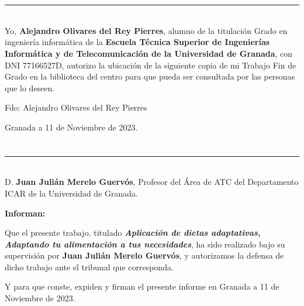\chapter*{}
\thispagestyle{empty}

\noindent\rule[-1ex]{\textwidth}{2pt}\\[4.5ex]

Yo, \textbf{Alejandro Olivares del Rey Pierres}, alumno de la titulación Grado en ingeniería informática de la \textbf{Escuela Técnica Superior
de Ingenierías Informática y de Telecomunicación de la Universidad de Granada}, con DNI 77166527D, autorizo la
ubicación de la siguiente copia de mi Trabajo Fin de Grado en la biblioteca del centro para que pueda ser
consultada por las personas que lo deseen.

\vspace{6cm}

\noindent Fdo: Alejandro Olivares del Rey Pierres

\vspace{2cm}

\begin{flushright}
Granada a 11 de Noviembre de 2023.
\end{flushright}


\chapter*{}
\thispagestyle{empty}

\noindent\rule[-1ex]{\textwidth}{2pt}\\[4.5ex]

D. \textbf{Juan Julián Merelo Guervós}, Profesor del Área de ATC del Departamento ICAR de la Universidad de Granada.

\vspace{0.5cm}

\textbf{Informan:}

\vspace{0.5cm}

Que el presente trabajo, titulado \textit{\textbf{Aplicación de dietas adaptativas,  Adaptando tu alimentación a tus necesidades}},
ha sido realizado bajo su supervisión por \textbf{Juan Julián Merelo Guervós}, y autorizamos la defensa de dicho trabajo ante el tribunal
que corresponda.

\vspace{0.5cm}

Y para que conste, expiden y firman el presente informe en Granada a 11 de Noviembre de 2023.

